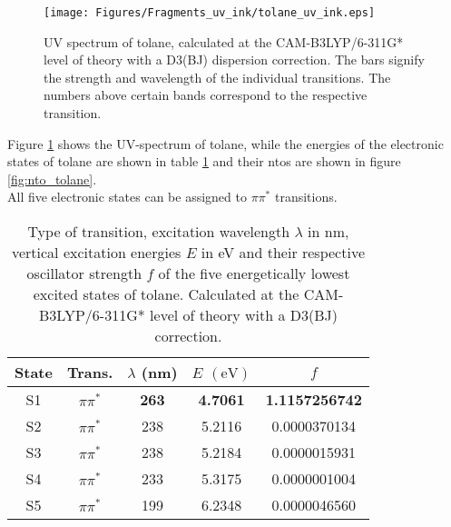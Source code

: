 \vspace{1 cm}
%
%
%
\begin{figure}[H]
    \centering
    \texttt{[image: Figures/Fragments\_uv\_ink/tolane\_uv\_ink.eps]}
    \caption{UV spectrum of tolane, calculated at the CAM-B3LYP/6-311G* level of theory with a D3(BJ) dispersion correction. 
    The bars signify the strength and wavelength of the individual transitions. 
    The numbers above certain bands correspond to the respective transition. }
    \label{fig:uv_fig_tolane}
\end{figure}
%
%
%
Figure \ref{fig:uv_fig_tolane} shows the UV-spectrum of tolane, while the energies of the electronic states of tolane are shown in table \ref{tab:excited_states_tolane} and their ntos are shown in figure \ref{fig:nto_tolane}.\\
All five electronic states can be assigned to $\pi\pi^*$ transitions.
%
%
%
\begin{table}[H]
\caption{Type of transition, excitation wavelength $\lambda$ in nm, vertical excitation energies $E$ in eV and their respective oscillator strength $f$ of the five energetically lowest excited states of tolane. 
Calculated at the CAM-B3LYP/6-311G* level of theory with a D3(BJ) correction.}
\label{tab:excited_states_tolane}
\vspace{0.1 cm}
\centering
\begin{tabular}{ccccc}
\toprule
State & Trans. & $\lambda$ (nm)     & $E$ $\left(\si{\eV}\right)$          & $f$    \\
\midrule
S1    & $\pi\pi^*$	& \textbf{263}    & \textbf{4.7061}        & \textbf{1.1157256742} \\
S2    & $\pi\pi^*$	& 238             & 5.2116                 & 0.0000370134          \\
S3    & $\pi\pi^*$	& 238             & 5.2184                 & 0.0000015931          \\
S4    & $\pi\pi^*$	& 233             & 5.3175                 & 0.0000001004          \\
S5    & $\pi\pi^*$	& 199             & 6.2348                 & 0.0000046560         \\
\bottomrule
\end{tabular}
\end{table}
%
%
%
